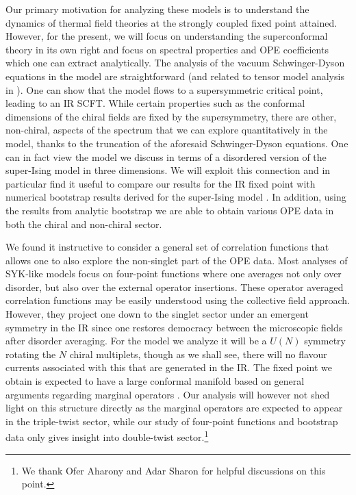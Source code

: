 \documentclass[11pt]{article}
\begin{document}
Our primary motivation for analyzing these models is to understand the dynamics of thermal field theories at the strongly coupled fixed point attained. However, for the present, we will focus on understanding the superconformal theory in its own right and focus on spectral properties and OPE coefficients which one can extract analytically.  The analysis of the vacuum Schwinger-Dyson equations in the model are straightforward (and related to tensor model analysis in \cite{Popov:2019nja}). One can show that the model flows to a supersymmetric critical point, leading to an IR SCFT. While certain properties such as the conformal dimensions of the chiral fields are fixed by the supersymmetry, there are other, non-chiral, aspects of the spectrum that we can explore quantitatively in the model, thanks to the truncation of the aforesaid Schwinger-Dyson equations. One can in fact view the model we discuss in terms of a disordered version of the super-Ising model in three dimensions.  We will exploit this connection and in particular find it useful to compare our results for the IR fixed point with numerical bootstrap results derived for the super-Ising model \cite{Bobev:2015vsa,Bobev:2015jxa}. In addition, using the results from analytic bootstrap \cite{Fitzpatrick:2012yx,Komargodski:2012ek,Costa:2012cb} we are able to obtain various OPE data in both the chiral and non-chiral sector.  

We found it instructive to consider a general set of correlation functions that allows one to also explore the non-singlet part of the OPE data. Most analyses of SYK-like models focus on four-point functions where one averages not only over disorder, but also over the external operator insertions. These  operator averaged correlation functions may be easily understood using the collective field approach. However, they  project one down to the singlet sector under an emergent symmetry in the IR since one restores democracy between the microscopic fields after disorder averaging. For the model we analyze it will be a $U(N)$ symmetry rotating the $N$ chiral multiplets, though as we shall see, there will no flavour currents associated with this that are generated in the IR. The fixed point we obtain is expected to have a large conformal manifold based on general arguments regarding marginal operators \cite{Leigh:1995ep,Chang:2010sg,Green:2010da}. Our analysis will however not shed light on this structure directly as the marginal operators are expected to appear in the triple-twist sector, while our study of four-point functions and bootstrap data only gives insight into double-twist sector.\footnote{We thank Ofer Aharony and Adar Sharon for helpful discussions on this point.} 
\end{document}
